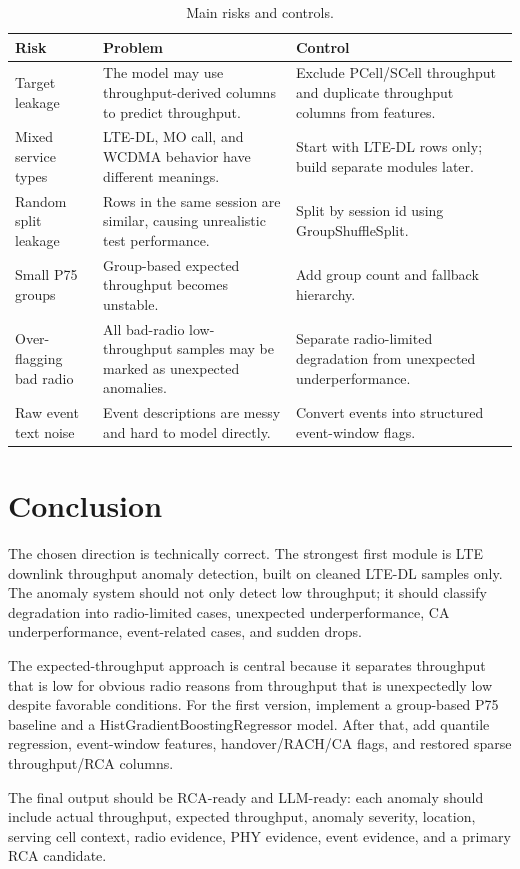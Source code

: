 \documentclass[12pt,a4paper]{article}
\begin{document}
\begin{table}[H]
\centering
\begin{tabularx}{\textwidth}{@{}L{0.26\textwidth}YY@{}}
\toprule
\textbf{Risk} & \textbf{Problem} & \textbf{Control} \\
\midrule
Target leakage & The model may use throughput-derived columns to predict throughput. & Exclude PCell/SCell throughput and duplicate throughput columns from features. \\
Mixed service types & LTE-DL, MO call, and WCDMA behavior have different meanings. & Start with LTE-DL rows only; build separate modules later. \\
Random split leakage & Rows in the same session are similar, causing unrealistic test performance. & Split by session id using GroupShuffleSplit. \\
Small P75 groups & Group-based expected throughput becomes unstable. & Add group count and fallback hierarchy. \\
Over-flagging bad radio & All bad-radio low-throughput samples may be marked as unexpected anomalies. & Separate radio-limited degradation from unexpected underperformance. \\
Raw event text noise & Event descriptions are messy and hard to model directly. & Convert events into structured event-window flags. \\
\bottomrule
\end{tabularx}
\caption{Main risks and controls.}
\end{table}

\section{Conclusion}

The chosen direction is technically correct. The strongest first module is LTE downlink throughput anomaly detection, built on cleaned LTE-DL samples only. The anomaly system should not only detect low throughput; it should classify degradation into radio-limited cases, unexpected underperformance, CA underperformance, event-related cases, and sudden drops.

The expected-throughput approach is central because it separates throughput that is low for obvious radio reasons from throughput that is unexpectedly low despite favorable conditions. For the first version, implement a group-based P75 baseline and a HistGradientBoostingRegressor model. After that, add quantile regression, event-window features, handover/RACH/CA flags, and restored sparse throughput/RCA columns.

The final output should be RCA-ready and LLM-ready: each anomaly should include actual throughput, expected throughput, anomaly severity, location, serving cell context, radio evidence, PHY evidence, event evidence, and a primary RCA candidate.
\end{document}
